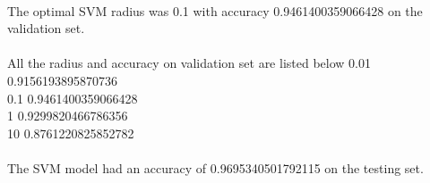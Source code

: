 \begin{answer}\\
The optimal SVM radius was 0.1 with accuracy 0.9461400359066428 on the validation set.\\
\\
All the radius and accuracy on validation set are listed below
0.01 0.9156193895870736\\
0.1 0.9461400359066428\\
1 0.9299820466786356\\
10 0.8761220825852782\\\\
The SVM model had an accuracy of 0.9695340501792115 on the testing set.\\
\end{answer}
